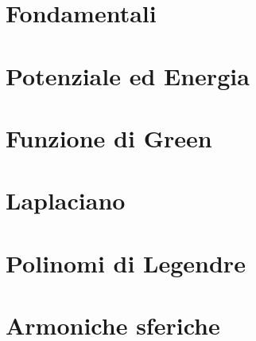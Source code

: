 \documentclass{article}
\begin{document}
\section{Fondamentali}


\section{Potenziale ed Energia}


\section{Funzione di Green}


\section{Laplaciano}


\section{Polinomi di Legendre}


\section{Armoniche sferiche}

\end{document}
